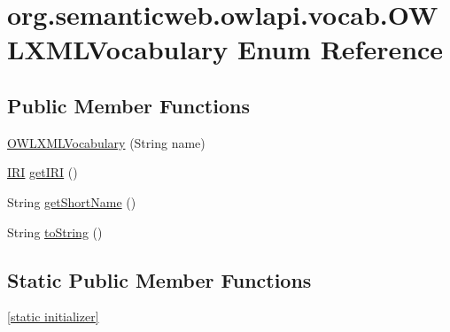 \hypertarget{enumorg_1_1semanticweb_1_1owlapi_1_1vocab_1_1_o_w_l_x_m_l_vocabulary}{\section{org.\-semanticweb.\-owlapi.\-vocab.\-O\-W\-L\-X\-M\-L\-Vocabulary Enum Reference}
\label{enumorg_1_1semanticweb_1_1owlapi_1_1vocab_1_1_o_w_l_x_m_l_vocabulary}
}
\subsection*{Public Member Functions}
\begin{DoxyCompactItemize}
\item 
\hyperlink{enumorg_1_1semanticweb_1_1owlapi_1_1vocab_1_1_o_w_l_x_m_l_vocabulary_a82aae01d7e98e3e251c4224773ee8676}{O\-W\-L\-X\-M\-L\-Vocabulary} (String name)
\item 
\hyperlink{classorg_1_1semanticweb_1_1owlapi_1_1model_1_1_i_r_i}{I\-R\-I} \hyperlink{enumorg_1_1semanticweb_1_1owlapi_1_1vocab_1_1_o_w_l_x_m_l_vocabulary_ad21aaefb3169fe081c861f6cba4ff015}{get\-I\-R\-I} ()
\item 
String \hyperlink{enumorg_1_1semanticweb_1_1owlapi_1_1vocab_1_1_o_w_l_x_m_l_vocabulary_a465bba8ae13e7ebc35180142afdc067c}{get\-Short\-Name} ()
\item 
String \hyperlink{enumorg_1_1semanticweb_1_1owlapi_1_1vocab_1_1_o_w_l_x_m_l_vocabulary_a6ede7b4cb8b1314fd93514d487c56a40}{to\-String} ()
\end{DoxyCompactItemize}
\subsection*{Static Public Member Functions}
\begin{DoxyCompactItemize}
\item 
\hyperlink{enumorg_1_1semanticweb_1_1owlapi_1_1vocab_1_1_o_w_l_x_m_l_vocabulary_abcec414ef2f6ff60aa6d463cbfdd330b}{\mbox{[}static initializer\mbox{]}}
\end{DoxyCompactItemize}
